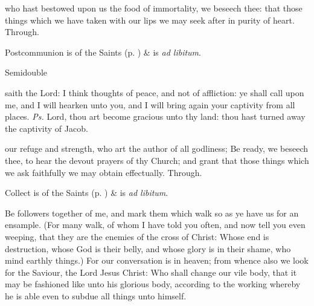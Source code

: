 
\postcommunion
{} who hast bestowed upon us the food of immortality, we beseech thee: that those things which we have taken with our lips we may seek after in purity of heart. Through.
\begin{rubric}
     Postcommunion is of the Saints (p. \pageref{SPSaints}) \&  is \emph{ad libitum}.
\end{rubric}

\begin{inhead}
{Semidouble}
\end{inhead}
\par\noindent
{}




\properantiphonfix

\introit
{} saith the Lord: I think thoughts of peace, and not of affliction: ye shall call upon me, and I will hearken unto you, and I will bring again your captivity from all places. \textit{Ps.} Lord, thou art become gracious unto thy land: thou hast turned away the captivity of Jacob.

\collect
{} our refuge and strength, who art the author of all godliness; Be ready, we beseech thee, to hear the devout prayers of thy Church; and grant that those things which we ask faithfully we may obtain effectually. Through.
\begin{rubric}
     Collect is of the Saints (p. \pageref{SPSaints}) \&  is \emph{ad libitum}.
\end{rubric}

 Be followers together of me, and mark them which walk so as ye have us for an ensample. (For many walk, of whom I have told you often, and now tell you even weeping, that they are the enemies of the cross of Christ: Whose end is destruction, whose God is their belly, and whose glory is in their shame, who mind earthly things.) For our conversation is in heaven; from whence also we look for the Saviour, the Lord Jesus Christ: Who shall change our vile body, that it may be fashioned like unto his glorious body, according to the working whereby he is able even to subdue all things unto himself.

